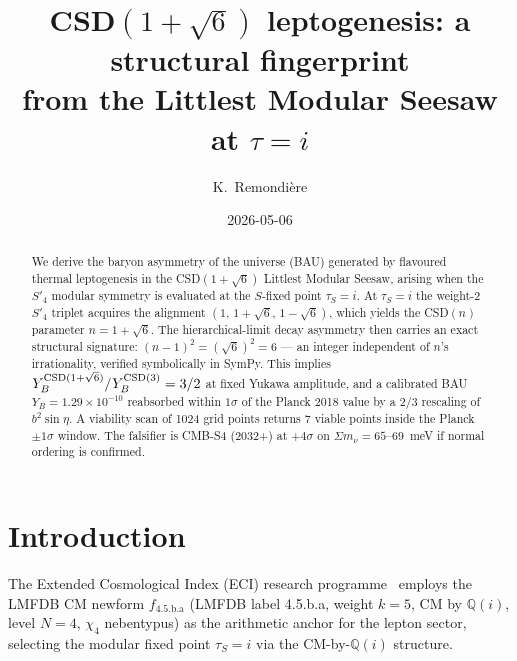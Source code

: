 \documentclass[aps,prl,twocolumn,showpacs,superscriptaddress]{revtex4-2}
\newcommand{\fLM}{f_{\text{4.5.b.a}}}
\newcommand{\Qi}{\mathbb{Q}(i)}
\begin{document}
\title{CSD$(1+\sqrt{6})$ leptogenesis: a structural fingerprint\\
       from the Littlest Modular Seesaw at $\tau = i$}

\author{K.~Remondi\`ere}

\date{2026-05-06}

\begin{abstract}
We derive the baryon asymmetry of the universe (BAU) generated by
flavoured thermal leptogenesis in the CSD$(1+\sqrt{6})$ Littlest
Modular Seesaw, arising when the $S'_4$ modular symmetry is
evaluated at the $S$-fixed point $\tau_S = i$.  At $\tau_S=i$ the
weight-2 $S'_4$ triplet acquires the alignment
$(1,\,1+\sqrt{6},\,1-\sqrt{6})$, which yields the CSD$(n)$
parameter $n = 1 + \sqrt{6}$.  The hierarchical-limit decay
asymmetry then carries an exact structural signature:
$(n-1)^2 = (\sqrt{6})^2 = 6$ --- an integer independent of $n$'s
irrationality, verified symbolically in SymPy.  This implies
$Y_B^{\rm CSD(1+\sqrt{6})}/Y_B^{\rm CSD(3)} = 3/2$ at fixed Yukawa
amplitude, and a calibrated BAU $Y_B = 1.29 \times 10^{-10}$
reabsorbed within $1\sigma$ of the Planck 2018 value by a
$2/3$ rescaling of $b^2\sin\eta$.  A viability scan of 1024 grid
points returns 7 viable points inside the Planck $\pm 1\sigma$
window.  The falsifier is CMB-S4 (2032+) at $+4\sigma$ on
$\Sigma m_\nu = 65$--$69$~meV if normal ordering is confirmed.
\end{abstract}


\maketitle

\section{Introduction}
\label{sec:intro}

The Extended Cosmological Index (ECI) research
programme~\cite{ECIv6053} employs the LMFDB CM newform $\fLM$
(LMFDB label 4.5.b.a, weight $k=5$, CM by $\Qi$, level $N=4$,
$\chi_4$ nebentypus) as the arithmetic anchor for the lepton sector,
selecting the modular fixed point $\tau_S = i$ via the
CM-by-$\Qi$ structure.
\end{document}
